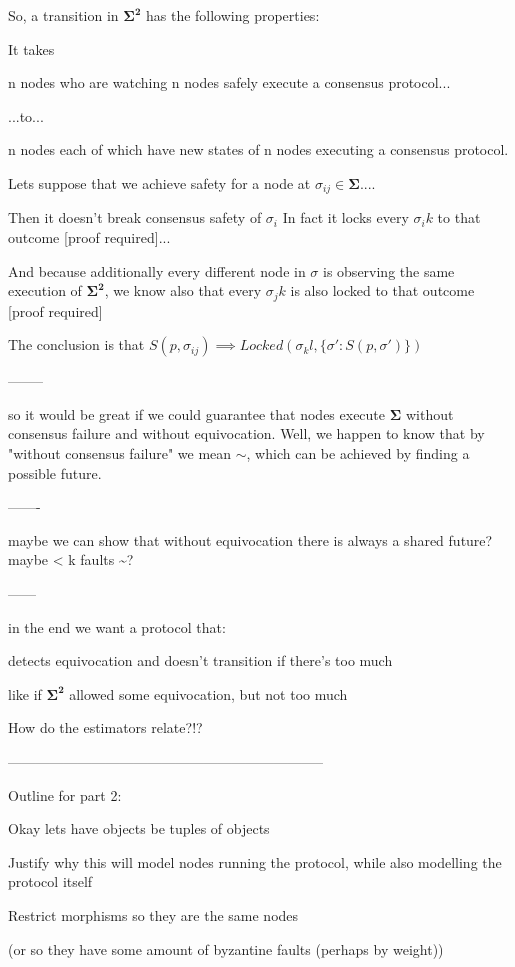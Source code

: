 \documentclass{article}
\theoremstyle{definition}
\newcommand{\cat}{
	\mathbf
}
\begin{document}
So, a transition in $\cat{\Sigma^2}$ has the following properties:

It takes 

n nodes who are watching n nodes safely execute a consensus protocol...

...to...

n nodes each of which have new states of n nodes executing a consensus protocol.



Lets suppose that we achieve safety for a node at $\sigma_{ij} \in \cat{\Sigma}$....

Then it doesn't break consensus safety of $\sigma_i$
In fact it locks every $\sigma_ik$ to that outcome [proof required]...

And because additionally every different node in $\sigma$ is observing the same execution of $\cat{\Sigma^2}$, we know also that every $\sigma_jk$ is also locked to that outcome [proof required]

The conclusion is that $S(p,\sigma_{ij}) \implies Locked(\sigma_kl, \{\sigma': S(p,\sigma')\})$

--------

so it would be great if we could guarantee that nodes execute $\cat{\Sigma}$ without consensus failure and without equivocation. Well, we happen to know that by "without consensus failure" we mean $\sim$, which can be achieved by finding a possible future.

-------

maybe we can show that without equivocation there is always a shared future?
maybe < k faults \implies \sim?


------

in the end we want a protocol that:

detects equivocation and doesn't transition if there's too much

like if $\cat{\Sigma^2}$ allowed some equivocation, but not too much


How do the estimators relate?!?


--------------------------------------------------------------------

Outline for part 2:

Okay lets have objects be tuples of objects

Justify why this will model nodes running the protocol, while also modelling the protocol itself

Restrict morphisms so they are the same nodes

(or so they have some amount of byzantine faults (perhaps by weight))
\end{document}
